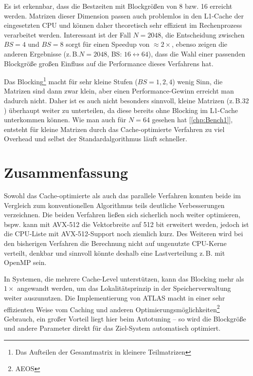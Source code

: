 \documentclass[a4paper,11pt]{scrartcl}
\newcommand{\zB}{\mbox{z.\,B.}\xspace}
\newcommand{\bspw}{\mbox{bspw.}\xspace}
\newcommand{\bzw}{\mbox{bzw.}\xspace}
\begin{document}
Es ist erkennbar, dass die Bestzeiten mit Blockgrößen von 8 \bzw 16 erreicht werden.
Matrizen dieser Dimension passen auch problemlos in den L1-Cache der eingesetzten CPU
und können daher theoretisch sehr effizient im Rechenprozess verarbeitet werden.
Interessant ist der Fall $N=2048$, die Entscheidung zwischen $BS=4$ und $BS=8$
sorgt für einen Speedup von $\approx 2\times$, ebenso zeigen die anderen
Ergebnisse (\zB $N=2048$, BS: $16 \leftrightarrow 64$), dass die Wahl einer
passenden Blockgröße großen Einfluss auf die Performance dieses Verfahrens hat.
\newline

Das Blocking\footnote{Das Aufteilen der Gesamtmatrix in kleinere Teilmatrizen} macht für
sehr kleine Stufen ($BS=1,2,4$)  wenig Sinn, die Matrizen sind dann zwar klein, aber
einen Performance-Gewinn erreicht man dadurch nicht. Daher ist es auch nicht besonders sinnvoll,
kleine Matrizen (\zB $32$) überhaupt weiter zu unterteilen, da diese bereits ohne Blocking
im L1-Cache unterkommen können. Wie man auch für $N=64$ gesehen hat [\ref{chp:Bench1}], 
entsteht für kleine 
Matrizen durch das Cache-optimierte Verfahren zu viel Overhead und selbst der
Standardalgorithmus läuft schneller.

\section{Zusammenfassung}
Sowohl das Cache-optimierte als auch das parallele Verfahren konnten beide
im Vergleich zum konventionellen Algorithmus teils deutliche Verbesserungen verzeichnen.
Die beiden Verfahren ließen sich sicherlich noch weiter optimieren, \bspw
kann mit AVX-512 die Vektorbreite auf 512 bit erweitert werden, jedoch ist die
CPU-Liste mit AVX-512-Support noch ziemlich kurz. Des Weiteren wird bei den bisherigen Verfahren
die Berechnung nicht auf ungenutzte CPU-Kerne verteilt, denkbar und sinnvoll könnte
deshalb eine Lastverteilung \zB mit OpenMP sein.\newline
 
In Systemen, die mehrere Cache-Level unterstützen, kann das Blocking mehr als $1\times$ angewandt werden,
um das Lokalitätsprinzip in der Speicherverwaltung weiter auszunutzen.
Die Implementierung von ATLAS macht in einer sehr effizienten Weise vom Caching 
und anderen Optimierungsmöglichkeiten\footnote{AEOS} Gebrauch, ein großer Vorteil
liegt hier beim Autotuning -- so wird die Blockgröße und andere Parameter direkt für das 
Ziel-System automatisch optimiert.\newline
\end{document}
